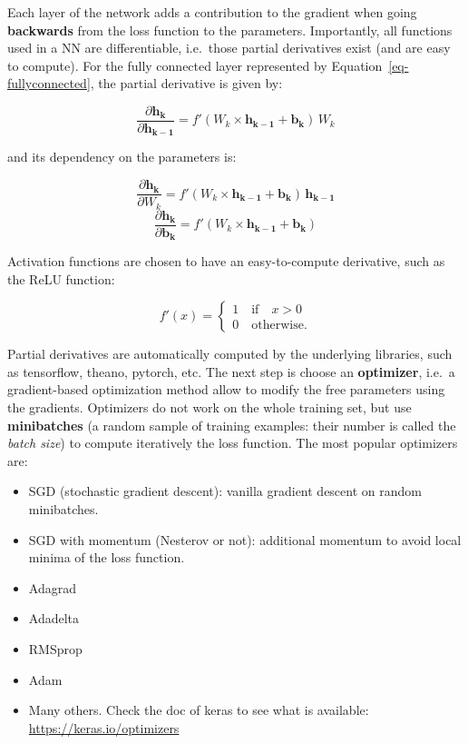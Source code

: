 \documentclass[
  letterpaper,
  DIV=11,
  numbers=noendperiod]{scrreprt}
\providecommand{\tightlist}{%
  \setlength{\itemsep}{0pt}\setlength{\parskip}{0pt}}\usepackage{longtable,booktabs,array}
\begin{document}
Each layer of the network adds a contribution to the gradient when going
\textbf{backwards} from the loss function to the parameters.
Importantly, all functions used in a NN are differentiable, i.e.~those
partial derivatives exist (and are easy to compute). For the fully
connected layer represented by Equation~\ref{eq-fullyconnected}, the
partial derivative is given by:

\[
    \frac{\partial \mathbf{h_{k}}}{\partial \mathbf{h_{k-1}}} = f'(W_k \times \mathbf{h_{k-1}} + \mathbf{b_k}) \, W_k
\]

and its dependency on the parameters is:

\[
    \frac{\partial \mathbf{h_{k}}}{\partial W_k} = f'(W_k \times \mathbf{h_{k-1}} + \mathbf{b_k}) \, \mathbf{h_{k-1}}
\] \[
    \frac{\partial \mathbf{h_{k}}}{\partial \mathbf{b_k}} = f'(W_k \times \mathbf{h_{k-1}} + \mathbf{b_k})
\]

Activation functions are chosen to have an easy-to-compute derivative,
such as the ReLU function:

\[
    f'(x) = \begin{cases} 1 \quad \text{if} \quad x > 0 \\ 0 \quad \text{otherwise.} \end{cases}
\]

Partial derivatives are automatically computed by the underlying
libraries, such as tensorflow, theano, pytorch, etc. The next step is
choose an \textbf{optimizer}, i.e.~a gradient-based optimization method
allow to modify the free parameters using the gradients. Optimizers do
not work on the whole training set, but use \textbf{minibatches} (a
random sample of training examples: their number is called the
\emph{batch size}) to compute iteratively the loss function. The most
popular optimizers are:

\begin{itemize}
\tightlist
\item
  SGD (stochastic gradient descent): vanilla gradient descent on random
  minibatches.
\item
  SGD with momentum (Nesterov or not): additional momentum to avoid
  local minima of the loss function.
\item
  Adagrad
\item
  Adadelta
\item
  RMSprop
\item
  Adam
\item
  Many others. Check the doc of keras to see what is available:
  \url{https://keras.io/optimizers}
\end{itemize}
\end{document}
